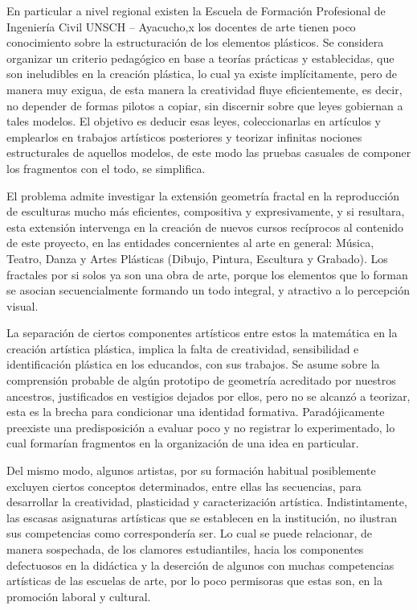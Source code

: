 \documentclass[12pt,]{report}
\begin{document}
En particular a nivel regional existen la Escuela de Formación Profesional de Ingeniería
Civil UNSCH -- Ayacucho,x los docentes de arte tienen poco conocimiento sobre la
estructuración de los elementos plásticos. Se considera organizar un criterio pedagógico
en base a teorías prácticas y establecidas, que son ineludibles en la creación plástica, lo
cual ya existe implícitamente, pero de manera muy exigua, de esta manera la creatividad
fluye eficientemente, es decir, no depender de formas pilotos a copiar, sin discernir sobre
que leyes gobiernan a tales modelos. El objetivo es deducir esas leyes, coleccionarlas
en artículos y emplearlos en trabajos artísticos posteriores y teorizar infinitas nociones
estructurales de aquellos modelos, de este modo las pruebas casuales de componer los
fragmentos con el todo, se simplifica.

El problema admite investigar la extensión geometría fractal en la reproducción de
esculturas mucho más eficientes, compositiva y expresivamente, y si resultara, esta
extensión intervenga en la creación de nuevos cursos recíprocos al contenido de este
proyecto, en las entidades concernientes al arte en general: Música, Teatro, Danza y Artes
Plásticas (Dibujo, Pintura, Escultura y Grabado). Los fractales por si solos ya son una
obra de arte, porque los elementos que lo forman se asocian secuencialmente formando
un todo integral, y atractivo a lo percepción visual.

La separación de ciertos componentes artísticos entre estos la matemática en la creación
artística plástica, implica la falta de creatividad, sensibilidad e identificación plástica
en los educandos, con sus trabajos. Se asume sobre la comprensión probable de algún prototipo
de geometría acreditado por nuestros ancestros, justificados en vestigios dejados
por ellos, pero no se alcanzó a teorizar, esta es la brecha para condicionar una identidad
formativa. Paradójicamente preexiste una predisposición a evaluar poco y no registrar lo
experimentado, lo cual formarían fragmentos en la organización de una idea en particular.

Del mismo modo, algunos artistas, por su formación habitual posiblemente excluyen
ciertos conceptos determinados, entre ellas las secuencias, para desarrollar la creatividad,
plasticidad y caracterización artística. Indistintamente, las escasas asignaturas artísticas
que se establecen en la institución, no ilustran sus competencias como correspondería
ser. Lo cual se puede relacionar, de manera sospechada, de los clamores estudiantiles,
hacia los componentes defectuosos en la didáctica y la deserción de algunos con muchas
competencias artísticas de las escuelas de arte, por lo poco permisoras que estas son, en
la promoción laboral y cultural.
\end{document}
